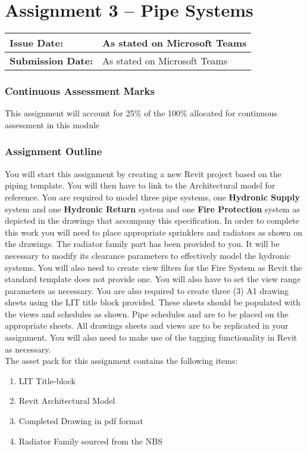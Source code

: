 
	
\part*{Assignment 3 – Pipe Systems}

\begin{tabularx}{\textwidth}{ |X|X| }
	\hline
	\textbf{Issue Date:} & As stated on Microsoft Teams \\
	\hline 
	\textbf{Submission Date:}  & As stated on Microsoft Teams  \\
	\hline
\end{tabularx}


\section*{Continuous Assessment Marks}
This assignment will account for 25\% of the 100\% allocated for continuous assessment in this module

\section*{Assignment Outline}
You will start this assignment by creating a new Revit project based on the piping template. You will then have to link to the Architectural model for reference.  You are required to model three pipe systems, one \textbf{Hydronic Supply} system and one \textbf{Hydronic Return} system and one \textbf{Fire Protection} system as depicted in the drawings that accompany this specification. In order to complete this work you will need to place appropriate sprinklers and radiators as shown on the drawings. The radiator family part has been provided to you. It will be necessary to modify its clearance parameters to effectively model the hydronic systems.  You will also need to create view filters for the Fire System as Revit the standard template does not provide one. You will also have to set the view range parameters as necessary.  You are also required to create three (3) A1 drawing sheets using the LIT title block provided. These sheets should be populated with the views and schedules as shown.  Pipe schedules and are to be placed on the appropriate sheets. All drawings sheets and views are to be replicated in your assignment. You will also need to make use of the tagging functionality in Revit as necessary.\\

The asset pack for this assignment contains the following items:
\begin{enumerate}
	\item LIT Title-block
	\item Revit Architectural Model
	\item Completed Drawing in pdf format
	\item Radiator Family sourced from the NBS
\end{enumerate}


